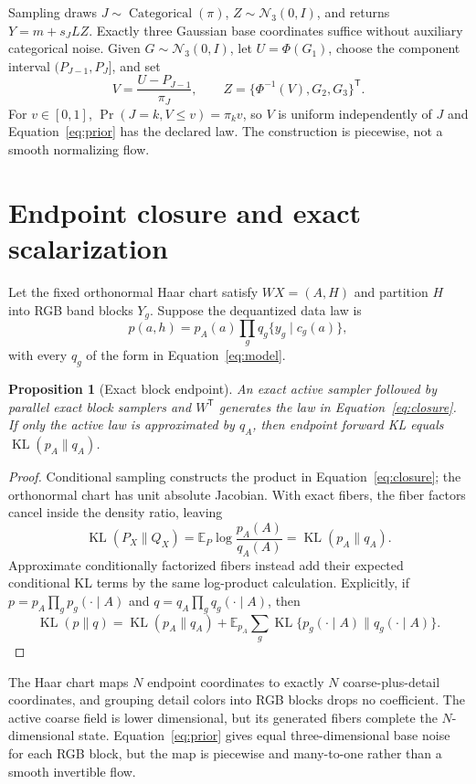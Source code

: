 \documentclass[11pt]{article}
\newtheorem{proposition}{Proposition}[section]
\DeclareMathOperator{\KL}{KL}
\newcommand{\E}{\mathbb E}
\begin{document}
Sampling draws $J\sim\operatorname{Categorical}(\pi)$, $Z\sim\mathcal N_3(0,I)$, and returns $Y=m+s_JLZ$.  Exactly three Gaussian base coordinates suffice without auxiliary categorical noise.  Given $G\sim\mathcal N_3(0,I)$, let $U=\Phi(G_1)$, choose the component interval $(P_{J-1},P_J]$, and set
\begin{equation}
 V=\frac{U-P_{J-1}}{\pi_J},\qquad
 Z=\{\Phi^{-1}(V),G_2,G_3\}^{\mathsf T}.
 \label{eq:prior}
\end{equation}
For $v\in[0,1]$, $\Pr(J=k,V\le v)=\pi_kv$, so $V$ is uniform independently of $J$ and Equation~\eqref{eq:prior} has the declared law.  The construction is piecewise, not a smooth normalizing flow.

\section{Endpoint closure and exact scalarization}

Let the fixed orthonormal Haar chart satisfy $WX=(A,H)$ and partition $H$ into RGB band blocks $Y_g$.  Suppose the dequantized data law is
\begin{equation}
 p(a,h)=p_A(a)\prod_g q_g\{y_g\mid c_g(a)\},
 \label{eq:closure}
\end{equation}
with every $q_g$ of the form in Equation~\eqref{eq:model}.

\begin{proposition}[Exact block endpoint]
An exact active sampler followed by parallel exact block samplers and $W^{\mathsf T}$ generates the law in Equation~\eqref{eq:closure}.  If only the active law is approximated by $q_A$, then endpoint forward KL equals $\KL(p_A\|q_A)$.
\end{proposition}

\begin{proof}
Conditional sampling constructs the product in Equation~\eqref{eq:closure}; the orthonormal chart has unit absolute Jacobian.  With exact fibers, the fiber factors cancel inside the density ratio, leaving
\[
 \KL(P_X\|Q_X)=\E_P\log\frac{p_A(A)}{q_A(A)}=\KL(p_A\|q_A).
\]
Approximate conditionally factorized fibers instead add their expected conditional KL terms by the same log-product calculation.  Explicitly, if $p=p_A\prod_gp_g(\cdot\mid A)$ and $q=q_A\prod_gq_g(\cdot\mid A)$, then
\[
 \KL(p\|q)=\KL(p_A\|q_A)+
 \E_{p_A}\sum_g\KL\{p_g(\cdot\mid A)\|q_g(\cdot\mid A)\}.
\]
\end{proof}

The Haar chart maps $N$ endpoint coordinates to exactly $N$ coarse-plus-detail coordinates, and grouping detail colors into RGB blocks drops no coefficient.  The active coarse field is lower dimensional, but its generated fibers complete the $N$-dimensional state.  Equation~\eqref{eq:prior} gives equal three-dimensional base noise for each RGB block, but the map is piecewise and many-to-one rather than a smooth invertible flow.
\end{document}
